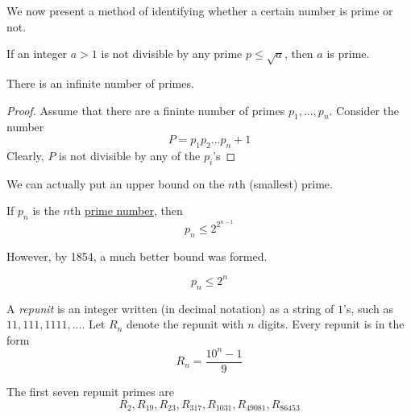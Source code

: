 \documentclass{article}
\newcounter{theorem}[section]
\newcounter{definition}[section]
\begin{document}
We now present a method of identifying whether a certain number is prime or not. 

\begin{theorem}
  \label{thm:sieve-of-eratosthenes}
If an integer $a >1$ is not divisible by any prime $p \leq \sqrt{a}$, then $a$ is prime. 
\end{theorem}

\begin{theorem}[Euclid]
  \label{thm:euclid}
There is an infinite number of primes.
\end{theorem}
\begin{proof}
Assume that there are a fininte number of primes $p_1, ..., p_n$. Consider the number 
\begin{equation}
  P = p_1 p_2... p_n + 1
\end{equation}
Clearly, $P$ is not divisible by any of the $p_i$'s 
\end{proof}

We can actually put an upper bound on the $n$th (smallest) prime. 

\begin{theorem}
  \label{thm:doubly-exponential-bound-on-the-nth-prime}
If $p_n$ is the $n$th \hyperref[def:prime-number]{prime number}, then 
\begin{equation}
  p_n \leq 2^{2^{n-1}}
\end{equation}
\end{theorem}

However, by 1854, a much better bound was formed. 
\begin{theorem}
  \label{thm:linear-exponential-bound-on-the-nth-prime}
\begin{equation}
  p_n \leq 2^n
\end{equation}
\end{theorem}

\begin{definition}[Repunit]
  \label{def:repunit}
A \textit{repunit} is an integer written (in decimal notation) as a string of $1$'s, such as $11, 111, 1111, ...$. Let $R_n$ denote the repunit with $n$ digits. Every repunit is in the form 
\begin{equation}
  R_n = \frac{10^n - 1}{9}
\end{equation}
\end{definition}

The first seven repunit primes are
\begin{equation}
  R_2, R_{19}, R_{23}, R_{317}, R_{1031}, R_{49081}, R_{86453}
\end{equation}
\end{document}
